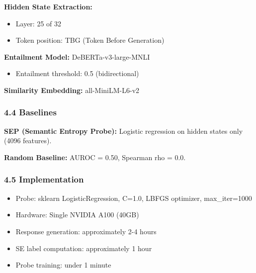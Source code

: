 \textbf{Hidden State Extraction:}
\begin{itemize}
\item Layer: 25 of 32
\item Token position: TBG (Token Before Generation)
\end{itemize}

\textbf{Entailment Model:} DeBERTa-v3-large-MNLI
\begin{itemize}
\item Entailment threshold: 0.5 (bidirectional)
\end{itemize}

\textbf{Similarity Embedding:} all-MiniLM-L6-v2

\subsubsection{4.4 Baselines}

\textbf{SEP (Semantic Entropy Probe):} Logistic regression on hidden states only (4096 features).

\textbf{Random Baseline:} AUROC = 0.50, Spearman rho = 0.0.

\subsubsection{4.5 Implementation}

\begin{itemize}
\item Probe: sklearn LogisticRegression, C=1.0, LBFGS optimizer, max\_iter=1000
\item Hardware: Single NVIDIA A100 (40GB)
\item Response generation: approximately 2-4 hours
\item SE label computation: approximately 1 hour
\item Probe training: under 1 minute
\end{itemize}
